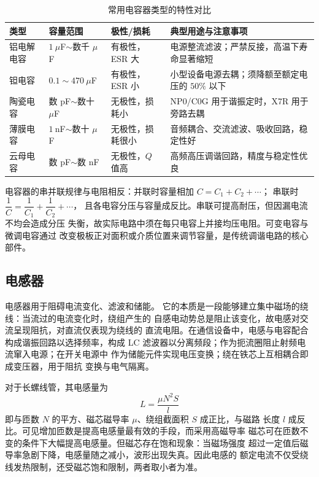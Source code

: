 \begin{table}[htbp]
\centering
\caption{常用电容器类型的特性对比}
\begin{tabular}{|p{2.0cm}|p{2.2cm}|p{2.4cm}|p{4.6cm}|}
\hline
\textbf{类型} & \textbf{容量范围} & \textbf{极性/损耗} & \textbf{典型用途与注意事项} \\
\hline
铝电解电容 & $1\ \mu$F$\sim$数千 $\mu$F & 有极性，ESR 大 & 电源整流滤波；严禁反接，高温下寿命显著缩短 \\
\hline
钽电容 & $0.1\sim470\ \mu$F & 有极性，ESR 小 & 小型设备电源去耦；须降额至额定电压的 $50\%$ 以下 \\
\hline
陶瓷电容 & 数 pF$\sim$数十 $\mu$F & 无极性，损耗小 & NP0/C0G 用于谐振定时，X7R 用于旁路去耦 \\
\hline
薄膜电容 & $1\ $nF$\sim$数十 $\mu$F & 无极性，损耗很小 & 音频耦合、交流滤波、吸收回路，稳定性好 \\
\hline
云母电容 & 数 pF$\sim$数 nF & 无极性，$Q$ 值高 & 高频高压调谐回路，精度与稳定性优良 \\
\hline
\end{tabular}
\end{table}

电容器的串并联规律与电阻相反：并联时容量相加 $C = C_1 + C_2 + \cdots$；
串联时 $\dfrac{1}{C} = \dfrac{1}{C_1} + \dfrac{1}{C_2} + \cdots$，
且各电容分压与容量成反比。串联可提高耐压，但因漏电流不均会造成分压
失衡，故实际电路中须在每只电容上并接均压电阻。可变电容与微调电容通过
改变极板正对面积或介质位置来调节容量，是传统调谐电路的核心部件。

\subsection{电感器}

电感器用于阻碍电流变化、滤波和储能。
它的本质是一段能够建立集中磁场的绕线：当流过的电流变化时，绕组产生的
自感电动势总是阻止该变化，故电感对交流呈现阻抗，对直流仅表现为绕线的
直流电阻。在通信设备中，电感与电容配合构成谐振回路以选择频率，构成
LC 滤波器以分离频段；作为扼流圈阻止射频电流窜入电源；在开关电源中
作为储能元件实现电压变换；绕在铁芯上互相耦合即成变压器，用于阻抗
变换与电气隔离。

对于长螺线管，其电感量为
\[
L = \frac{\mu N^2 S}{l}
\]
即与匝数 $N$ 的平方、磁芯磁导率 $\mu$、绕组截面积 $S$ 成正比，与磁路
长度 $l$ 成反比。可见增加匝数是提高电感量最有效的手段，而采用高磁导率
磁芯可在匝数不变的条件下大幅提高电感量。但磁芯存在饱和现象：当磁场强度
超过一定值后磁导率急剧下降，电感量随之减小，波形出现失真。因此电感的
额定电流不仅受绕线发热限制，还受磁芯饱和限制，两者取小者为准。

